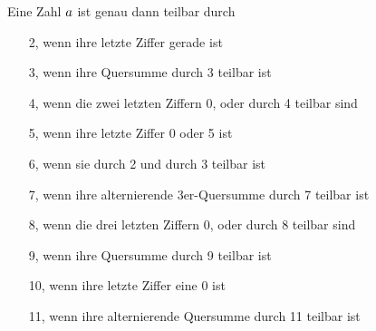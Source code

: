 Eine Zahl $a$ ist genau dann teilbar durch
\begin{itemize}
  \item[2,]  wenn ihre letzte Ziffer gerade ist
  \item[3,]  wenn ihre Quersumme durch 3 teilbar ist
  \item[4,]  wenn die zwei letzten Ziffern 0, oder durch 4 teilbar sind
  \item[5,]  wenn ihre letzte Ziffer 0 oder 5 ist
  \item[6,]  wenn sie durch 2 und durch 3 teilbar ist
  \item[7,]  wenn ihre alternierende 3er-Quer\-sum\-me durch 7 teilbar ist
  \item[8,]  wenn die drei letzten Ziffern 0, oder durch 8 teilbar sind
  \item[9,]  wenn ihre Quersumme durch 9 teilbar ist
  \item[10,] wenn ihre letzte Ziffer eine 0 ist
  \item[11,] wenn ihre alternierende Quersumme durch 11 teilbar ist
\end{itemize}

